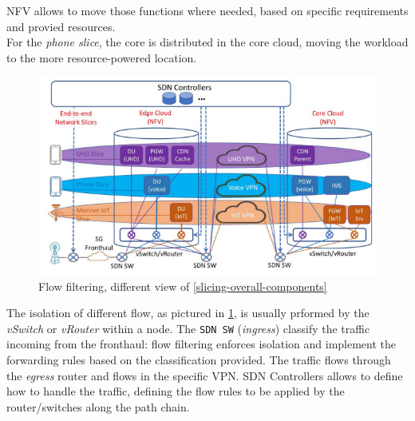 \documentclass[10pt,a4paper]{report}
\theoremstyle{definition}
\begin{document}
NFV allows to move those functions where needed, based on specific requirements and provied resources.\\
For the \textit{phone slice}, the core is distributed in the core cloud, moving the workload to the more resource-powered location.

\begin{figure}[h]
	\centering\includegraphics[scale=0.50]{images/Pasted image 20230420150455.png}
	\caption{Flow filtering, different view of \ref{slicing-overall-components}}
	\label{flow-filtering-view}
\end{figure}

The isolation of different flow, as pictured in \ref{flow-filtering-view},  is usually prformed by the \textit{vSwitch} or \textit{vRouter} within a node. The \texttt{SDN SW} (\textit{ingress}) classify the traffic incoming from the fronthaul: flow filtering enforces isolation and implement the forwarding rules based on the classification provided.  The traffic flows through the \textit{egress} router and flows in the specific VPN. SDN Controllers allows to define how to handle the traffic, defining the flow rules to be applied by the router/switches along the path chain. 
\end{document}
